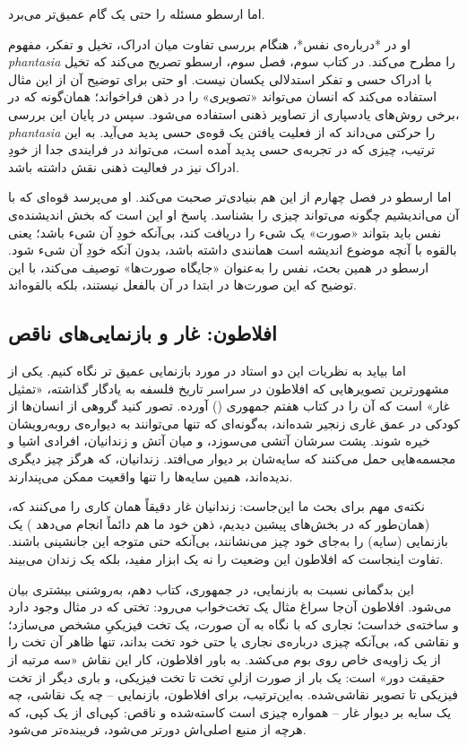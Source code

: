 اما ارسطو مسئله را حتی یک گام عمیق‌تر می‌برد.

او در *درباره‌ی نفس*، هنگام بررسی تفاوت میان ادراک، تخیل و تفکر، مفهوم \textit{phantasia} را مطرح می‌کند. در کتاب سوم، فصل سوم، ارسطو تصریح می‌کند که تخیل با ادراک حسی و تفکر استدلالی یکسان نیست. او حتی برای توضیح آن از این مثال استفاده می‌کند که انسان می‌تواند «تصویری» را در ذهن فراخواند؛ همان‌گونه که در برخی روش‌های یادسپاری از تصاویر ذهنی استفاده می‌شود. سپس در پایان این بررسی، \textit{phantasia} را حرکتی می‌داند که از فعلیت یافتن یک قوه‌ی حسی پدید می‌آید. به این ترتیب، چیزی که در تجربه‌ی حسی پدید آمده است، می‌تواند در فرایندی جدا از خودِ ادراک نیز در فعالیت ذهنی نقش داشته باشد. 

اما ارسطو در فصل چهارم از این هم بنیادی‌تر صحبت می‌کند. او می‌پرسد قوه‌ای که با آن می‌اندیشیم چگونه می‌تواند چیزی را بشناسد. پاسخ او این است که بخش اندیشنده‌ی نفس باید بتواند «صورت» یک شیء را دریافت کند، بی‌آنکه خودِ آن شیء باشد؛ یعنی بالقوه با آنچه موضوع اندیشه است همانندی داشته باشد، بدون آنکه خودِ آن شیء شود. ارسطو در همین بحث، نفس را به‌عنوان «جایگاه صورت‌ها» توصیف می‌کند، با این توضیح که این صورت‌ها در ابتدا در آن بالفعل نیستند، بلکه بالقوه‌اند.

\subsection{افلاطون: غار و بازنمایی‌های ناقص}
\label{sub:plato-cave}

اما  بیاید به نظریات این دو استاد در مورد بازنمایی عمیق تر نگاه کنیم.  
یکی از مشهورترین تصویرهایی که افلاطون در سراسر تاریخ فلسفه به یادگار گذاشته، «تمثیل غار» است که آن را در کتاب هفتم جمهوری () آورده. تصور کنید گروهی از انسان‌ها از کودکی در عمق غاری زنجیر شده‌اند، به‌گونه‌ای که تنها می‌توانند به دیواره‌ی روبه‌رویشان خیره شوند. پشت سرشان آتشی می‌سوزد، و میان آتش و زندانیان، افرادی اشیا و مجسمه‌هایی حمل می‌کنند که سایه‌شان بر دیوار می‌افتد. زندانیان، که هرگز چیز دیگری ندیده‌اند، همین سایه‌ها را تنها واقعیت ممکن می‌پندارند\autocite{plato-republic}.

نکته‌ی مهم برای بحث ما این‌جاست: زندانیان غار دقیقاً همان کاری را می‌کنند که، (همان‌طور که در بخش‌های پیشین دیدیم، ذهن خود ما هم دائماً انجام می‌دهد )  یک بازنمایی (سایه) را به‌جای خود چیز می‌نشانند، بی‌آنکه حتی متوجه این جانشینی باشند. تفاوت اینجاست که افلاطون این وضعیت را نه یک ابزار مفید، بلکه یک زندان می‌بیند.

این بدگمانی نسبت به بازنمایی، در جمهوری، کتاب دهم، به‌روشنی بیشتری بیان می‌شود. افلاطون آن‌جا سراغ مثال یک تخت‌خواب می‌رود: تختی که در مثال وجود دارد و ساخته‌ی خداست؛ نجاری که با نگاه به آن صورت، یک تخت فیزیکیِ مشخص می‌سازد؛ و نقاشی که، بی‌آنکه چیزی درباره‌ی نجاری یا حتی خود تخت بداند، تنها ظاهر آن تخت را از یک زاویه‌ی خاص روی بوم می‌کشد. به باور افلاطون، کار این نقاش «سه مرتبه از حقیقت دور» است: یک بار از صورت ازلیِ تخت تا تخت فیزیکی، و باری دیگر از تخت فیزیکی تا تصویر نقاشی‌شده\autocite{plato-republic}. به‌این‌ترتیب، برای افلاطون، بازنمایی -- چه یک نقاشی، چه یک سایه بر دیوار غار -- همواره چیزی است کاسته‌شده و ناقص: کپی‌ای از یک کپی، که هرچه از منبع اصلی‌اش دورتر می‌شود، فریبنده‌تر می‌شود.

